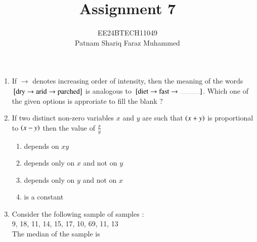 \documentclass[journal]{IEEEtran}
\begin{document}

\vspace{3cm}

\title{Assignment 7}
\author{EE24BTECH11049 \\ Patnam Shariq Faraz Muhammed}
{\let\newpage\relax\maketitle}
\begin{enumerate}
	\item If $\to$ denotes increasing order of intensity, then the meaning of the words ${}\left[\text{dry} \to \text{arid} \to \text{parched}\right]$ is analogous to $\sbrak{\text{diet} \to \text{fast} \to \rule{1cm}{0.1pt}}$. Which one of the given options is approriate to fill the blank ?
		\begin{enumerate}
		\end{enumerate}
	\item If two distinct non-zero variables $x$ and $y$ are such that $\left(x+y\right)$ is proportional to $\left(x-y\right)$ then the value of $\frac{x}{y}$ 
		\begin{enumerate}
			\item depends on $xy$
			\item depends only on $x$ and not on $y$
			\item depends only on $y$ and not on $x$
			\item is a constant
		\end{enumerate}
	\item Consider the following sample of samples : \\
		9, 18, 11, 14, 15, 17, 10, 69, 11, 13 \\
		The median of the sample is
		\begin{enumerate}
\end{enumerate}
\end{enumerate}
\end{document}
